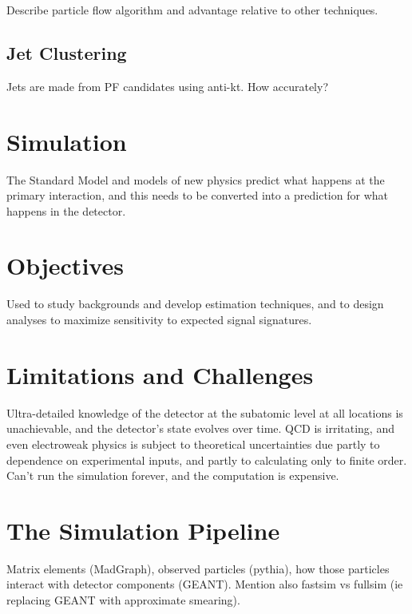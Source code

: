   Describe particle flow algorithm and advantage relative to other techniques.

  \subsection{Jet Clustering} \label{sec:jetclustering}

  Jets are made from PF candidates using anti-kt.
  How accurately?

\section{Simulation} \label{sec:simulation}

  The Standard Model and models of new physics predict what happens at the primary interaction, and this needs to be converted into a prediction for what happens in the detector.

  \section{Objectives} \label{sec:objectives}

  Used to study backgrounds and develop estimation techniques, and to design analyses to maximize sensitivity to expected signal signatures.

  \section{Limitations and Challenges} \label{sec:limitations}

  Ultra-detailed knowledge of the detector at the subatomic level at all locations is unachievable, and the detector's state evolves over time.
  QCD is irritating, and even electroweak physics is subject to theoretical uncertainties due partly to dependence on experimental inputs, and partly to calculating only to finite order.
  Can't run the simulation forever, and the computation is expensive.

  \section{The Simulation Pipeline} \label{sec:pipeline}

  Matrix elements (MadGraph), observed particles (pythia), how those particles interact with detector components (GEANT).
  Mention also fastsim vs fullsim (ie replacing GEANT with approximate smearing).
